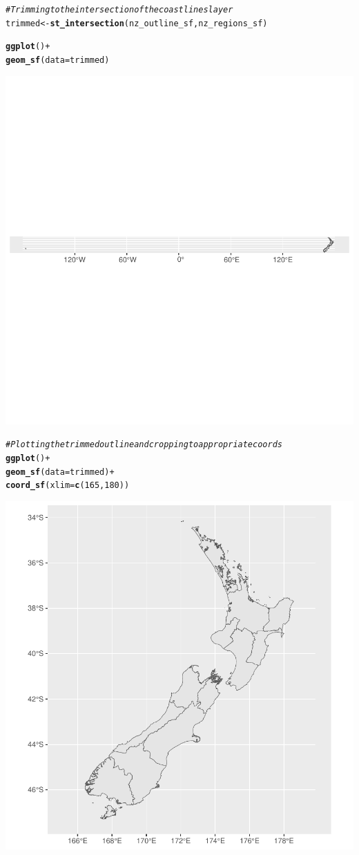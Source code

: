 \documentclass{article}\usepackage[]{graphicx}\usepackage[]{xcolor}
\makeatletter
\newcommand{\hlnum}[1]{\textcolor[rgb]{0.686,0.059,0.569}{#1}}%
\newcommand{\hlcom}[1]{\textcolor[rgb]{0.678,0.584,0.686}{\textit{#1}}}%
\newcommand{\hlopt}[1]{\textcolor[rgb]{0,0,0}{#1}}%
\newcommand{\hlstd}[1]{\textcolor[rgb]{0.345,0.345,0.345}{#1}}%
\newcommand{\hlkwb}[1]{\textcolor[rgb]{0.69,0.353,0.396}{#1}}%
\newcommand{\hlkwc}[1]{\textcolor[rgb]{0.333,0.667,0.333}{#1}}%
\newcommand{\hlkwd}[1]{\textcolor[rgb]{0.737,0.353,0.396}{\textbf{#1}}}%
\newenvironment{kframe}{%
 \def\at@end@of@kframe{}%
 \ifinner\ifhmode%
  \def\at@end@of@kframe{\end{minipage}}%
  \begin{minipage}{\columnwidth}%
 \fi\fi%
 \def\FrameCommand##1{\hskip\@totalleftmargin \hskip-\fboxsep
 \colorbox{shadecolor}{##1}\hskip-\fboxsep
     \hskip-\linewidth \hskip-\@totalleftmargin \hskip\columnwidth}%
 \MakeFramed {\advance\hsize-\width
   \@totalleftmargin\z@ \linewidth\hsize
   \@setminipage}}%
 {\par\unskip\endMakeFramed%
 \at@end@of@kframe}
\newenvironment{knitrout}{}{} %
\makeatother
\begin{document}
\begin{knitrout}
{}


\begin{kframe}\begin{alltt}
\hlcom{# Trimming to the intersection of the coastlines layer}
\hlstd{trimmed} \hlkwb{<-} \hlkwd{st_intersection}\hlstd{(nz_outline_sf, nz_regions_sf)}
\end{alltt}


{\ttfamily\noindent\color{warningcolor}{\#\# Warning: attribute variables are assumed to be spatially constant throughout all geometries}}\begin{alltt}
\hlkwd{ggplot}\hlstd{()}\hlopt{+}
  \hlkwd{geom_sf}\hlstd{(}\hlkwc{data} \hlstd{= trimmed)}
\end{alltt}
\end{kframe}

{\centering \includegraphics[width=.6\linewidth]{figure/introduction-to-R-for-economists-Rnwauto-report-4} 

}


\begin{kframe}\begin{alltt}
\hlcom{# Plotting the trimmed outline and cropping to appropriate coords}
\hlkwd{ggplot}\hlstd{()} \hlopt{+}
  \hlkwd{geom_sf}\hlstd{(}\hlkwc{data} \hlstd{= trimmed)} \hlopt{+}
  \hlkwd{coord_sf}\hlstd{(}\hlkwc{xlim} \hlstd{=} \hlkwd{c}\hlstd{(}\hlnum{165}\hlstd{,} \hlnum{180}\hlstd{))}
\end{alltt}
\end{kframe}

{\centering \includegraphics[width=.6\linewidth]{figure/introduction-to-R-for-economists-Rnwauto-report-5} 

}
\end{knitrout}
\end{document}

